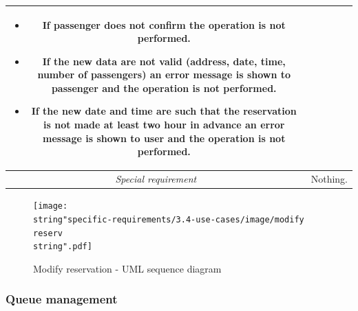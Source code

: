 \begin{flushleft}
\begin{tabular}{c|>{\raggedright}p{10cm}}
\begin{itemize}
\item \begin{raggedright}
If passenger does not confirm the operation is not performed.
\par\end{raggedright}
\item \begin{raggedright}
If the new data are not valid (address, date, time, number of passengers)
an error message is shown to passenger and the operation is not performed.
\par\end{raggedright}
\item \raggedright{}If the new date and time are such that the reservation
is not made at least two hour in advance an error message is shown
to user and the operation is not performed.\end{itemize}
\tabularnewline
\hline 
\emph{Special requirement} & \raggedright{}Nothing.\tabularnewline
\hline 
\end{tabular}
\par\end{flushleft}

\clearpage{}

\begin{figure}[H]
\begin{centering}
\texttt{[image: \\string"specific-requirements/3.4-use-cases/image/modify reserv\\string".pdf]}
\par\end{centering}

\protect\caption{Modify reservation - UML sequence diagram}
\end{figure}


\clearpage{}


\subsubsection{Queue management}

